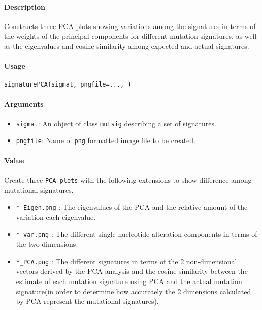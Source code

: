 \documentclass[]{article}
\providecommand{\tightlist}{%
  \setlength{\itemsep}{0pt}\setlength{\parskip}{0pt}}
\let\oldparagraph\paragraph
\renewcommand{\paragraph}[1]{\oldparagraph{#1}\mbox{}}
\begin{document}
\paragraph{\texorpdfstring{\textbf{Description}}{Description}}\label{description-8}

Constructs three PCA plots showing variations among the signatures in
terms of the weights of the principal components for different mutation
signatures, as well as the eigenvalues and cosine similarity among
expected and actual signatures.

\paragraph{\texorpdfstring{\textbf{Usage}}{Usage}}\label{usage-9}

\texttt{signaturePCA(sigmat,\ pngfile=...,\ )}

\paragraph{\texorpdfstring{\textbf{Arguments
}}{Arguments }}\label{arguments-8}

\begin{itemize}
\tightlist
\item
  \texttt{sigmat}: An object of class \texttt{mutsig} describing a set
  of signatures.
\item
  \texttt{pngfile}: Name of \texttt{png} formatted image file to be
  created.
\end{itemize}

\paragraph{\texorpdfstring{\textbf{Value}}{Value}}\label{value-7}

Create three \texttt{PCA\ plots} with the following extensions to show
difference among mutational signatures.

\begin{itemize}
\tightlist
\item
  \texttt{*\_Eigen.png} : The eigenvalues of the PCA and the relative
  amount of the variation each eigenvalue.
\item
  \texttt{*\_var.png} : The different single-nucleotide alteration
  components in terms of the two dimensions.
\item
  \texttt{*\_PCA.png} : The different signatures in terms of the 2
  non-dimensional vectors derived by the PCA analysis and the cosine
  similarity between the estimate of each mutation signature using PCA
  and the actual mutation signature(in order to determine how accurately
  the 2 dimensions calculated by PCA represent the mutational
  signatures).
\end{itemize}
\end{document}

